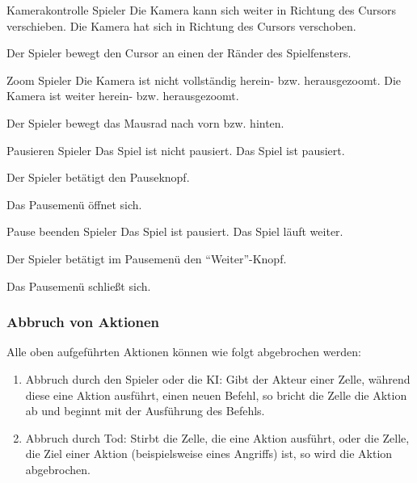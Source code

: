 \actionentry
{Kamerakontrolle}
{Spieler}
{Die Kamera kann sich weiter in Richtung des Cursors verschieben.}
{Die Kamera hat sich in Richtung des Cursors verschoben.}
{
  \begin{compactenum}
    \item Der Spieler bewegt den Cursor an einen der Ränder des Spielfensters.
  \end{compactenum}
}

\actionentry
{Zoom}
{Spieler}
{Die Kamera ist nicht vollständig herein- bzw. herausgezoomt.}
{Die Kamera ist weiter herein- bzw. herausgezoomt.}
{
  \begin{compactenum}
    \item Der Spieler bewegt das Mausrad nach vorn bzw. hinten.
  \end{compactenum}
}

\actionentry
{Pausieren}
{Spieler}
{Das Spiel ist nicht pausiert.}
{Das Spiel ist pausiert.}
{
  \begin{compactenum}
    \item Der Spieler betätigt den Pauseknopf.
    \item Das Pausemenü öffnet sich.
  \end{compactenum}
}

\actionentry
{Pause beenden}
{Spieler}
{Das Spiel ist pausiert.}
{Das Spiel läuft weiter.}
{
  \begin{compactenum}
    \item Der Spieler betätigt im Pausemenü den \enquote{Weiter}-Knopf.
    \item Das Pausemenü schließt sich.
  \end{compactenum}
}

\subsubsection{Abbruch von Aktionen}

Alle oben aufgeführten Aktionen können wie folgt abgebrochen werden:

\begin{enumerate}
  \item Abbruch durch den Spieler oder die KI: Gibt der Akteur einer
    Zelle, während diese eine Aktion ausführt, einen neuen Befehl, so
    bricht die Zelle die Aktion ab und beginnt mit der Ausführung des
    Befehls.
  \item Abbruch durch Tod: Stirbt die Zelle, die eine Aktion ausführt,
    oder die Zelle, die Ziel einer Aktion (beispielsweise eines Angriffs) ist,
    so wird die Aktion abgebrochen.
\end{enumerate}

